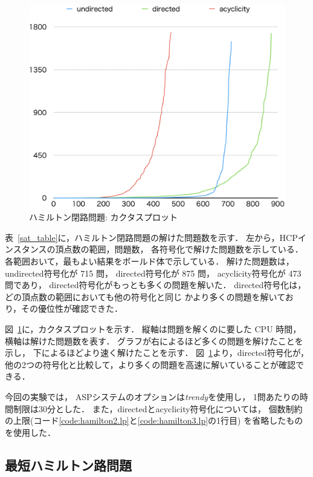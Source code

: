 \begin{figure}[tb]
\begin{center}
  \includegraphics[width=0.8\linewidth]{fig/cactus_fhcp.png}
\caption{ハミルトン閉路問題: カクタスプロット}
\label{cactus}
\end{center}
\end{figure}

表~\ref{sat_table}に，ハミルトン閉路問題の解けた問題数を示す．
左から，HCPインスタンスの頂点数の範囲，問題数，
各符号化で解けた問題数を示している．
各範囲おいて，最もよい結果をボールド体で示している．
% 
解けた問題数は，
\textsf{undirected}符号化が 715 問，
\textsf{directed}符号化が 875 問，
\textsf{acyclicity}符号化が 473 問であり，
\textsf{directed}符号化がもっとも多くの問題を解いた．
\textsf{directed}符号化は，どの頂点数の範囲においても他の符号化と同じ
かより多くの問題を解いており，その優位性が確認できた．

図~\ref{cactus}に，カクタスプロットを示す．
縦軸は問題を解くのに要した CPU 時間，横軸は解けた問題数を表す．
グラフが右によるほど多くの問題を解けたことを示し，
下によるほどより速く解けたことを示す．
図~\ref{cactus}より，\textsf{directed}符号化が，
他の2つの符号化と比較して，より多くの問題を高速に解いていることが確認できる．

今回の実験では，
ASPシステム{\clingo}のオプションは\textit{trendy}を使用し，
1問あたりの時間制限は30分とした．
また，\textsf{directed}と\textsf{acyclicity}符号化については，
個数制約の上限(コード\ref{code:hamilton2.lp}と\ref{code:hamilton3.lp}の1行目)
を省略したものを使用した．

\subsection{最短ハミルトン路問題}

